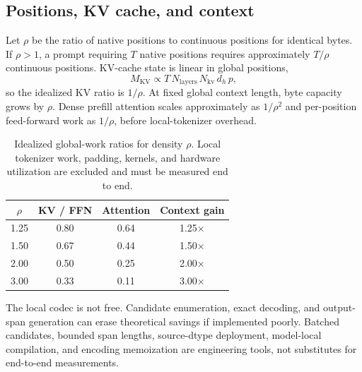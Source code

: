 \documentclass[10pt,twocolumn]{article}
\begin{document}
\subsection{Positions, KV cache, and context}

Let $\rho$ be the ratio of native positions to continuous positions for identical bytes. If
$\rho>1$, a prompt requiring $T$ native positions requires approximately $T/\rho$ continuous
positions. KV-cache state is linear in global positions,
\begin{equation}
M_{\mathrm{KV}} \propto T\,N_{\mathrm{layers}}\,N_{\mathrm{kv}}\,d_h\,p,
\end{equation}
so the idealized KV ratio is $1/\rho$. At fixed global context length, byte capacity grows by
$\rho$. Dense prefill attention scales approximately as $1/\rho^2$ and per-position feed-forward
work as $1/\rho$, before local-tokenizer overhead.

\begin{table}[t]
\centering
\caption{Idealized global-work ratios for density $\rho$. Local tokenizer work, padding, kernels,
and hardware utilization are excluded and must be measured end to end.}
\label{tab:density}
\scriptsize
\begin{tabular}{@{}c c c c@{}}
\toprule
$\rho$ & KV / FFN & Attention & Context gain \\
\midrule
1.25 & 0.80 & 0.64 & 1.25$\times$ \\
1.50 & 0.67 & 0.44 & 1.50$\times$ \\
2.00 & 0.50 & 0.25 & 2.00$\times$ \\
3.00 & 0.33 & 0.11 & 3.00$\times$ \\
\bottomrule
\end{tabular}
\end{table}

The local codec is not free. Candidate enumeration, exact decoding, and output-span generation can
erase theoretical savings if implemented poorly. Batched candidates, bounded span lengths,
source-dtype deployment, model-local compilation, and encoding memoization are engineering tools,
not substitutes for end-to-end measurements.
\end{document}
